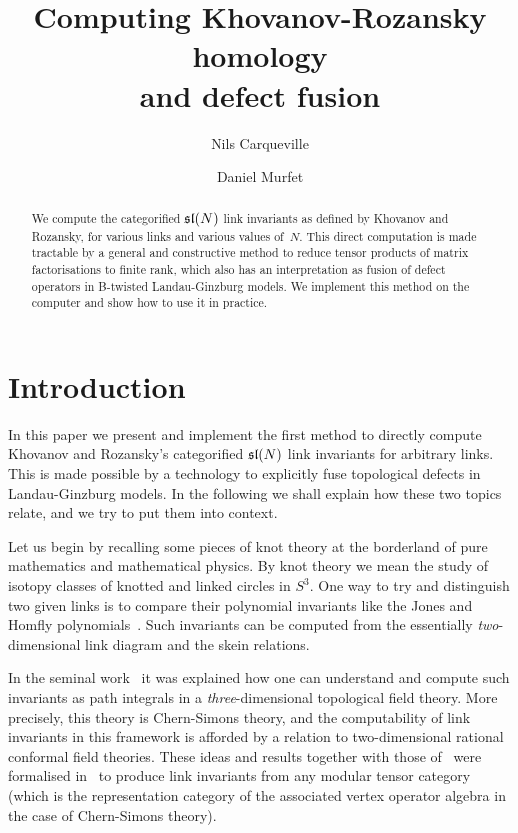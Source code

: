 \documentclass{compositio}
\theoremstyle{definition}
\numberwithin{equation}{section}
\begin{document}
\title{Computing Khovanov-Rozansky homology \\ and defect fusion}
\author{Nils Carqueville}
\address{Arnold Sommerfeld Center for Theoretical Physics, LMU M\"unchen \& Excellence Cluster Universe}

\author{Daniel Murfet}
\address{Department of Mathematics, UCLA}


\begin{abstract}
We compute the categorified $\mathfrak{sl}(N)$ link invariants as defined by Khovanov and Rozansky, for various links and various values of~$N$. This direct computation is made tractable by a general and constructive method to reduce tensor products of matrix factorisations to finite rank, which also has an interpretation as fusion of defect operators in B-twisted Landau-Ginzburg models. We implement this method on the computer and show how to use it in practice. 
\end{abstract}

\maketitle

\section{Introduction}

In this paper we present and implement the first method to directly compute Khovanov and Rozansky's categorified $\mathfrak{sl}(N)$ link invariants for arbitrary links. This is made possible by a technology to explicitly fuse topological defects in Landau-Ginzburg models. In the following we shall explain how these two topics relate, and we try to put them into context. 

Let us begin by recalling some pieces of knot theory at the borderland of pure mathematics and mathematical physics. By knot theory we mean the study of isotopy classes of knotted and linked circles in $S^3$. One way to try and distinguish two given links is to compare their polynomial invariants like the Jones and Homfly polynomials~\cite{JonesPolynomialPaper, Homfly, HomflyPT}. Such invariants can be computed from the essentially \emph{two}-dimensional link diagram and the skein relations. 

In the seminal work~\cite{wittenjones} it was explained how one can understand and compute such invariants as path integrals in a \emph{three}-dimensional topological field theory. More precisely, this theory is Chern-Simons theory, and the computability of link invariants in this framework is afforded by a relation to two-dimensional rational conformal field theories. These ideas and results together with those of~\cite{t1988YB} were formalised in~\cite{RT1990, RT1991, turaevbook} to produce link invariants from any modular tensor category (which is the representation category of the associated vertex operator algebra in the case of Chern-Simons theory). 
\end{document}
